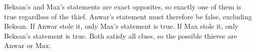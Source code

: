 Beksan's and Max's statements are exact opposites, so exactly one of them is true regardless of the thief. Anwar's statement must therefore be false, excluding Beksan. If Anwar stole it, only Max's statement is true. If Max stole it, only Beksan's statement is true. Both satisfy all clues, so the possible thieves are $\boxed{\text{Anwar or Max}}$.

